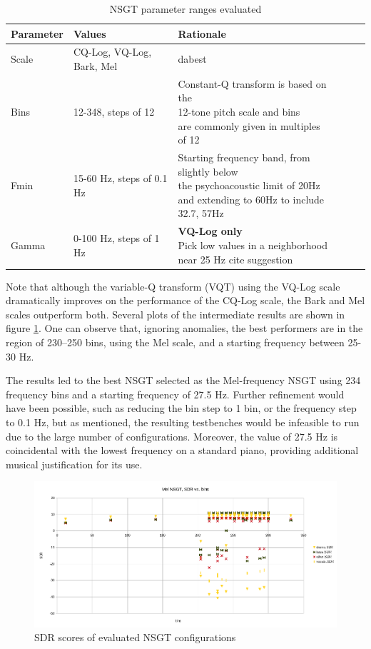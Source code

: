 \documentclass[letter,12pt,notitlepage]{article}
\begin{document}
\begin{table}[ht]
	\centering
\begin{tabular}{ |l|l|l|c|c|c| }
	 \hline
	  Parameter & Values & Rationale \\
	 \hline
	 \hline
	 Scale & CQ-Log, VQ-Log, Bark, Mel & dabest \\
	 \hline
	 Bins & 12-348, steps of 12 & \makecell[l] { Constant-Q transform is based on the \\ 12-tone pitch scale and bins \\ are commonly given in multiples of 12 } \\
	 \hline
	 Fmin & 15-60 Hz, steps of 0.1 Hz & \makecell[l] { Starting frequency band, from slightly below \\ the psychoacoustic limit of 20Hz \\ and extending to 60Hz to include 32.7, 57Hz } \\
	 \hline
	 Gamma & 0-100 Hz, steps of 1 Hz & \makecell[l] { \textbf{VQ-Log only}\\Pick low values in a neighborhood \\ near 25 Hz cite suggestion } \\
	 \hline
\end{tabular}
	\caption{NSGT parameter ranges evaluated}
	\label{table:nsgtparamsirm}
\end{table}

Note that although the variable-Q transform (VQT) using the VQ-Log scale dramatically improves on the performance of the CQ-Log scale, the Bark and Mel scales outperform both. Several plots of the intermediate results are shown in figure \ref{fig:melnsgt}. One can observe that, ignoring anomalies, the best performers are in the region of 230--250 bins, using the Mel scale, and a starting frequency between 25-30 Hz.

The results led to the best NSGT selected as the Mel-frequency NSGT using 234 frequency bins and a starting frequency of 27.5 Hz. Further refinement would have been possible, such as reducing the bin step to 1 bin, or the frequency step to 0.1 Hz, but as mentioned, the resulting testbenches would be infeasible to run due to the large number of configurations. Moreover, the value of 27.5 Hz is coincidental with the lowest frequency on a standard piano, providing additional musical justification for its use.

\begin{figure}[ht]
	\centering
	\includegraphics[width=16cm]{./mel_nsgt_params.png}
	\caption{SDR scores of evaluated NSGT configurations}
	\label{fig:melnsgt}
\end{figure}
\end{document}
